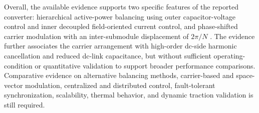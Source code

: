 Overall, the available evidence supports two specific features of the reported converter: hierarchical active-power balancing using outer capacitor-voltage control and inner decoupled field-oriented current control, and phase-shifted carrier modulation with an inter-submodule displacement of \(2\pi/N\) \cite{Jin2017}. The evidence further associates the carrier arrangement with high-order dc-side harmonic cancellation and reduced dc-link capacitance, but without sufficient operating-condition or quantitative validation to support broader performance comparisons. Comparative evidence on alternative balancing methods, carrier-based and space-vector modulation, centralized and distributed control, fault-tolerant synchronization, scalability, thermal behavior, and dynamic traction validation is still required. %